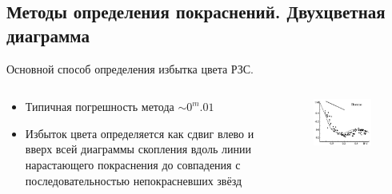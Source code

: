 \documentclass{beamer}
\begin{document}
    \subsection{Методы определения покраснений. Двухцветная диаграмма}
    \begin{frame}
        Основной способ определения избытка цвета РЗС.
        \begin{columns}
            \begin{column}{0.5\textwidth}
                    \begin{itemize}
                        \item Типичная погрешность метода $\sim 0^m.01$
                        \item Избыток цвета определяется как сдвиг 
                            влево и вверх всей диаграммы скопления вдоль линии нарастающего покраснения до совпадения с последовательностью непокрасневших звёзд
                    \end{itemize}
            \end{column}
            \begin{column}{0.5\textwidth}
                \begin{figure}
                \centering
                    \includegraphics[width=0.9\textwidth]{pictures/Pl2Col.jpg}
                \end{figure}
            \end{column}
        \end{columns}
    \end{frame}
\end{document}
